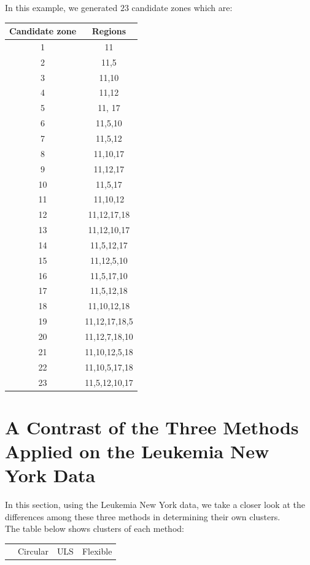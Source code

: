 \documentclass[12pt]{article}
\begin{document}
\begin{enumerate}
	In this example, we generated $23$ candidate zones which are: \\
	
	
		
	
	\begin{tabular}{|c|c|}
		\hline
		Candidate zone & Regions  \\
		\hline
		1 & 11  \\
		2 & 11,5 \\
		3 & 11,10 \\
		4 & 11,12 \\
		5 & 11, 17 \\
		6 &  11,5,10 \\
		7 & 11,5,12 \\
		8 & 11,10,17 \\
		9 & 11,12,17 \\
		10 & 11,5,17 \\
		11 & 11,10,12 \\
		12 & 11,12,17,18 \\
		13 & 11,12,10,17 \\
		14 & 11,5,12,17 \\
		15 & 11,12,5,10 \\
		16 & 11,5,17,10 \\
		17 & 11,5,12,18 \\
		18 & 11,10,12,18 \\
		19 &  11,12,17,18,5\\ 
		20 &   11,12,7,18,10 \\
		21 & 11,10,12,5,18 \\
		22 & 11,10,5,17,18 \\
		 23& 11,5,12,10,17 \\
	\hline
	\end{tabular}
	
	\section{A Contrast of the Three Methods Applied on the Leukemia New York Data}
	In this section, using the Leukemia New York data, we take a closer look at the differences among these three methods in determining their own clusters. \\
	The table below shows clusters of each method:\\
	
	\begin{tabular}{|c|c|c|c|}
	\hline
	& Circular & ULS & Flexible \\
	

\end{tabular}
\end{enumerate}
\end{document}
